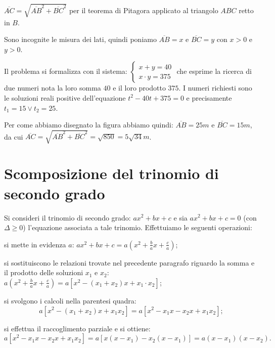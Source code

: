 \begin{soluzione}

$\overline{AC} = \sqrt{\overline{AB}^{2} + \overline{BC}^{2}}$ per il teorema di Pitagora applicato al triangolo $ABC$ retto in $B$.

Sono incognite le misura dei lati, quindi poniamo $\overline{AB}=x$ e $\overline {BC}=y$ con $x>0$ e $y>0$.

Il problema si formalizza con il sistema:
$\left\{ \begin{array}{l} x + y = 40 \\x \cdot y = 375 \end{array}\right.$
che esprime la ricerca di due numeri nota la loro somma $40$ e il loro prodotto $375$. I numeri richiesti sono le soluzioni reali positive dell'equazione $t^{2} - 40 t + 375 = 0$ e precisamente $t_{1} = 15 \vee t_{2} = 25$.

Per come abbiamo disegnato la figura abbiamo quindi: $\overline{AB} = 25\unit{m}$ e $\overline{BC} = 15\unit{m}$, da cui $\overline{AC} = \sqrt{\overline{AB}^{2} + \overline{BC}^{2}} =\sqrt{850} = 5 \sqrt{34}\unit{m}$.
\end{soluzione}
\vspazio\ovalbox{\risolvii \ref{ese:3.81}, \ref{ese:3.82}, \ref{ese:3.83}}

\section{Scomposizione del trinomio di secondo grado}

Si consideri il trinomio di secondo grado: $a x^{2} + b x + c$ e sia $a x^{2} + b x + c = 0$ (con $\Delta \geq 0$) l'equazione associata a tale trinomio. Effettuiamo le seguenti operazioni:
\begin{itemize*}
\item si mette in evidenza $a$: $a x^{2} + b x + c = a \left( x^{2} + \frac{b}{a} x + \frac{c}{a} \right)$;
\item si sostituiscono le relazioni trovate nel precedente paragrafo riguardo la somma e il prodotto delle soluzioni $x_{1}$ e $x_{2}$: $a \left( x^{2} + \frac{b}{a} x + \frac{c}{a} \right) = a \left[x^{2} - ( x_{1} + x_{2} ) x + x_{1} \cdot x_{2} \right]$;
\item si svolgono i calcoli nella parentesi quadra:
\[a \left[ x^{2} - ( x_{1} + x_{2} ) x + x_{1} x_{2}\right] = a\left[ x^{2} - x_{1} x - x_{2} x + x_{1} x_{2}\right];\]
\item si effettua il raccoglimento parziale e si ottiene:
\[a \left[x^{2} - x_{1} x - x_{2} x + x_{1} x_{2}\right] = a \left[ {x \left(x - x_{1} \right) - x_{2} \left( x - x_{1}\right)}\right] = a \left( x - x_{1} \right) \left( x - x_{2} \right).\]
\end{itemize*}

